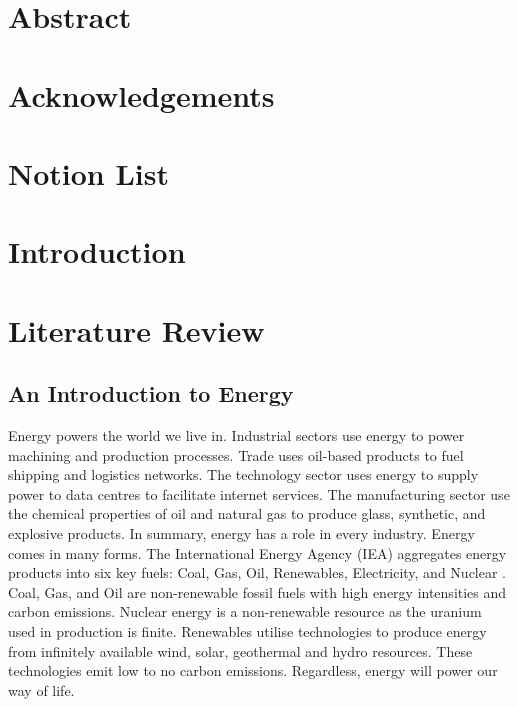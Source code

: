\documentclass[12pt]{article}
\begin{document}
\section*{Abstract}
\newpage
\section*{Acknowledgements}
\newpage
\tableofcontents
\newpage
\section*{Notion List}
\newpage
\listoffigures
\newpage
\listoftables
\section{Introduction}
\section{Literature Review}
\subsection{An Introduction to Energy}
	Energy powers the world we live in.
Industrial sectors use energy to power machining and production processes. Trade uses oil-based products to fuel shipping and logistics networks. 
The technology sector uses energy to supply power to data centres to facilitate internet services. The manufacturing sector use the chemical properties of oil and natural gas to produce glass, synthetic, and explosive products. 
In summary, energy has a role in every industry. Energy comes in many forms. 
The International Energy Agency (IEA) aggregates energy products into six key fuels: Coal, Gas, Oil, Renewables, Electricity, and Nuclear \cite{W:2}. 
Coal, Gas, and Oil are non-renewable fossil fuels with high energy intensities and carbon emissions. 
Nuclear energy is a non-renewable resource as the uranium used in production is finite. 
Renewables utilise technologies to produce energy from infinitely available wind, solar, geothermal and hydro resources. 
These technologies emit low to no carbon emissions. 
Regardless, energy will power our way of life.
\end{document}
